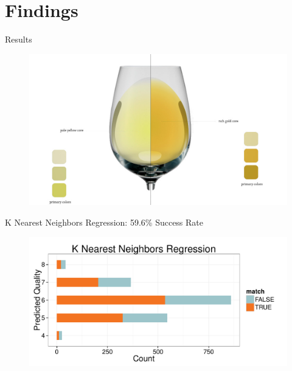 \documentclass{beamer}
\begin{document}
\section{Findings}
\begin{frame}{Results}
	\begin{figure}
		\centering
		\includegraphics[width=\textwidth]{../images/matching.jpg}
	\end{figure}
\end{frame}



\begin{frame}{K Nearest Neighbors Regression: 59.6\% Success Rate}
	\begin{figure}
		\centering
		\includegraphics[width=\textwidth]{../images/KNNRegression_Results.pdf}
	\end{figure}

\end{frame}
\end{document}
